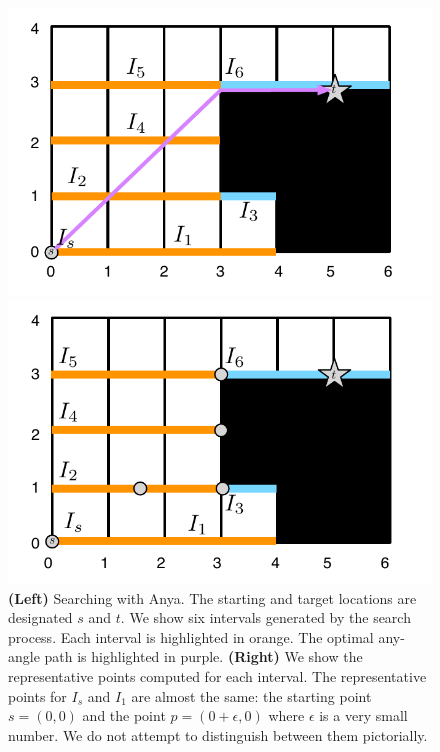 \begin{figure}[hb]
\center
\begin{minipage}{0.45\columnwidth}
\center
		   \includegraphics[width=\columnwidth]
			{images/anya_example.pdf}
	\vspace{-3pt}
\end{minipage}
\begin{minipage}{0.45\columnwidth}
\center
		   \includegraphics[width=\columnwidth]
			{images/anya_example_b.pdf}
	\vspace{-3pt}
\end{minipage}
\caption{
\small
\textbf{(Left)} Searching with Anya. The starting and target locations are designated $s$ and $t$.
We show six intervals generated by the search process. Each interval is highlighted in orange. 
The optimal any-angle path is highlighted in purple. 
\textbf{(Right)} We show the representative points computed for each interval. The representative
points for $I_s$ and $I_1$ are almost the same: the starting point $s = (0, 0)$ and the point $p = (0+\epsilon, 0)$
where $\epsilon$ is a very small number. We do not attempt to distinguish between them pictorially.
}
\label{fig::anya_example}
\end{figure}

